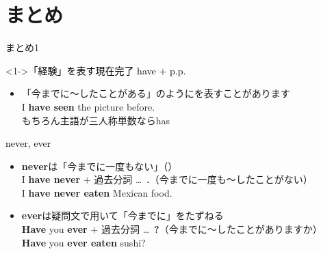 \documentclass[aspectratio=169,xcolor={dvipsnames,table}]{beamer}
\begin{document}
\section{まとめ}
\begin{frame}[plain,t]{まとめ1}
 
\begin{block}<1->{\textcolor{black}{\mdseries 「経験」を表す現在完了 have $+$ p.p.}}
\small

\begin{itemize}[square]
 \item 「今までに～したことがある」のようにを表すことがあります\\
\hfill{\scriptsize I {\bfseries have seen} the picture before.}\\
\hfill{\scriptsize もちろん主語が三人称単数ならhas}
\end{itemize}
\end{block}

\begin{block}{\textcolor{black}{\mdseries never, ever}}
\small
\begin{itemize}[square]\small
 \item {\bfseries never}は「今までに一度もない」（）\\
I {\bfseries have never} $+$ 過去分詞 \ldots\,\,\,\textbf{.}{{\footnotesize （今までに一度も〜したことがない）}}\\

\hfill{\scriptsize I {\bfseries have never eaten} Mexican food.}
 \item {\bfseries ever}は疑問文で用いて「今までに」\hfill{をたずねる}\\
{\bfseries Have} you  {\bfseries ever} $+$ 過去分詞 \ldots\,\,\,\textbf{?}{{\footnotesize （今までに〜したことがありますか）}}\\
\hfill{\scriptsize {\bfseries Have} you {\bfseries ever eaten} sushi?}
\end{itemize}
\end{block}
\end{frame}
\end{document}

